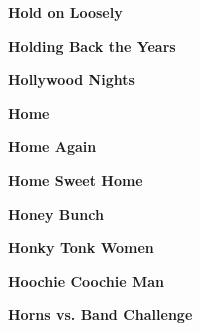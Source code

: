 \begin{center}\textbf{Hold on Loosely}\end{center}
\newline
\vspace{10pt} 
\begin{center}\textbf{Holding Back the Years}\end{center}
\newline
\vspace{10pt} 
\begin{center}\textbf{Hollywood Nights}\end{center}
\newline
\vspace{10pt} 
\begin{center}\textbf{Home}\end{center}
\newline
\vspace{10pt} 
\begin{center}\textbf{Home Again}\end{center}
\newline
\vspace{10pt} 
\begin{center}\textbf{Home Sweet Home}\end{center}
\newline
\vspace{10pt} 
\begin{center}\textbf{Honey Bunch}\end{center}
\newline
\vspace{10pt} 
\begin{center}\textbf{Honky Tonk Women}\end{center}
\newline
\vspace{10pt} 
\begin{center}\textbf{Hoochie Coochie Man}\end{center}
\newline
\vspace{10pt} 
\begin{center}\textbf{Horns vs. Band Challenge}\end{center}
